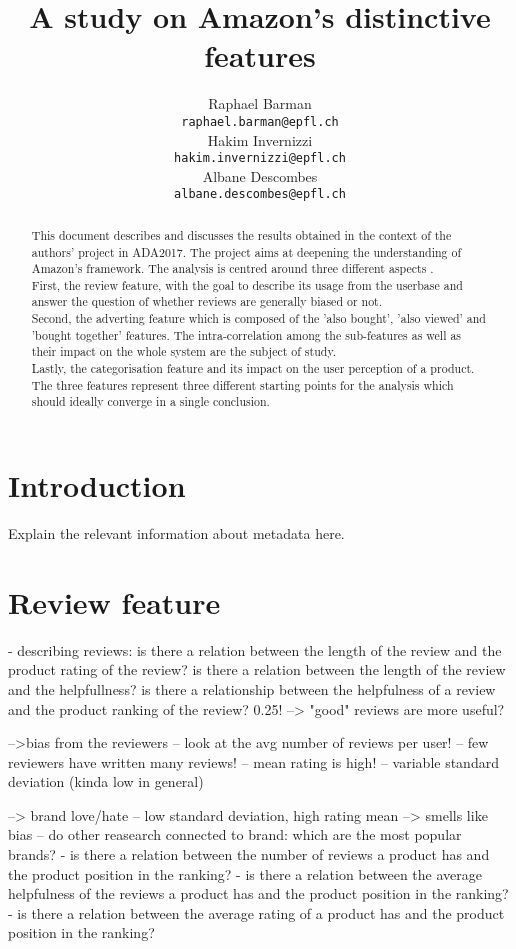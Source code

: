 \documentclass[11pt]{article}
\title{A study on Amazon's distinctive features}
\author{Raphael Barman \\
  {\tt raphael.barman@epfl.ch} \\\And
  Hakim Invernizzi \\
  {\tt hakim.invernizzi@epfl.ch} \\\And
Albane Descombes \\
{\tt albane.descombes@epfl.ch} \\}
\date{}
\begin{document}
\maketitle
\begin{abstract}
  This document describes and discusses the results obtained in the context of the authors' project in ADA2017. The project aims at deepening the understanding 
  of Amazon's framework. The analysis is centred around three different aspects . \\ First, the review feature, with the goal to describe its usage from the userbase and answer the question of whether reviews are generally biased or not. \\ Second, the adverting feature which is composed of the 'also bought', 'also viewed' and 'bought together' features. The intra-correlation among the sub-features as well as their impact on the whole system are the subject of study. \\ Lastly, the categorisation feature and its impact on the user perception of a product. \\  The three features represent three different starting points for the analysis which should ideally converge in a single conclusion.
\end{abstract}


\section{Introduction}
  Explain the relevant information about metadata here.
  
\section{Review feature}
 - describing reviews:
   is there a relation between the length of the review and the product rating of the review?
   is there a relation between the length of the review and the helpfullness?
   is there a relationship between the helpfulness of a review and the product ranking of the review? 0.25! --> "good" reviews are more useful?
   
   -->bias from the reviewers
   -- look at the avg number of reviews per user!
   -- few reviewers have written many reviews!
   -- mean rating is high!
   -- variable standard deviation (kinda low in general)
   
   --> brand love/hate
   -- low standard deviation, high rating mean --> smells like bias
   -- do other reasearch connected to brand: which are the most popular brands? 
   - is there a relation between the number of reviews a product has and the product position in the ranking?
   - is there a relation between the average helpfulness of the reviews a product has and the product position in the ranking?
   - is there a relation between the average rating of a product has and the product position in the ranking?
\end{document}
